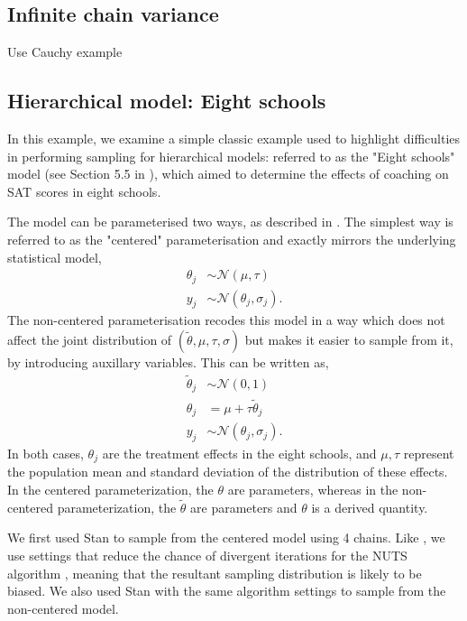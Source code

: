 \documentclass{article}
\newcommand{\N}{\mathcal{N}}
\begin{document}
\subsection{Infinite chain variance}
Use Cauchy example

\subsection{Hierarchical model: Eight schools}
In this example, we examine a simple classic example used to highlight difficulties in performing sampling for hierarchical models: referred to as the "Eight schools" model (see Section 5.5 in \cite{gelman2013bayesian}), which aimed to determine the effects of coaching on SAT scores in eight schools. 

The model can be parameterised two ways, as described in \cite{vehtari2019rank}. The simplest way is referred to as the "centered" parameterisation and exactly mirrors the underlying statistical model,
%
\begin{align*}
\theta_j &\sim \N(\mu, \tau) \\
y_j &\sim \N(\theta_j, \sigma_j).
\end{align*}
%
The non-centered parameterisation recodes this model in a way which does not affect the joint distribution of $(\tilde{\theta}, \mu, \tau, \sigma)$ but makes it easier to sample from it, by introducing auxillary variables. This can be written as,
%
\begin{align*}
\tilde{\theta}_j &\sim \N(0, 1) \\
\theta_j &= \mu + \tau \tilde{\theta}_j \\
y_j &\sim \N(\theta_j, \sigma_j).
\end{align*}
%
In both cases, $\theta_j$ are the treatment effects in the eight schools, and $\mu, \tau$ represent the population mean and standard deviation 
of the distribution of these effects. In the centered parameterization, the $\theta$ are parameters, whereas in the non-centered parameterization, the $\tilde{\theta}$ are parameters and $\theta$ is a derived quantity.

We first used Stan \cite{carpenter2017stan} to sample from the centered model using 4 chains. Like \cite{vehtari2019rank}, we use settings that reduce the chance of divergent iterations for the NUTS algorithm \cite{hoffman2014no}, meaning that the resultant sampling distribution is likely to be biased. We also used Stan with the same algorithm settings to sample from the non-centered model.
\end{document}
